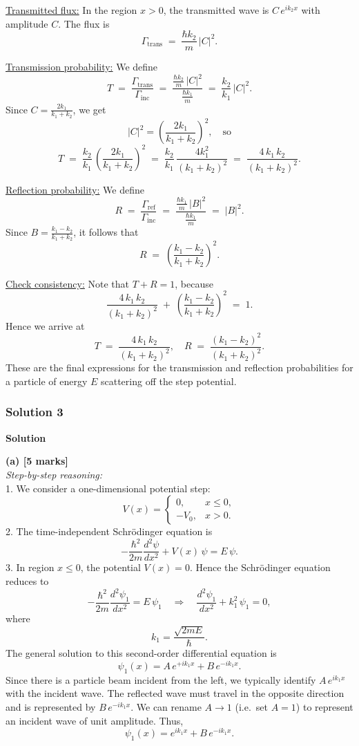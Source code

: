 \documentclass{article}
\begin{document}
\underline{Transmitted flux:} In the region \(x > 0\), the transmitted wave is \(C\, e^{i k_2 x}\) with amplitude \(C\). The flux is
\[
\Gamma_\mathrm{trans} \;=\;\frac{\hbar k_2}{m}\,\bigl|C\bigr|^2.
\]

\underline{Transmission probability:} We define
\[
T \;=\;\frac{\Gamma_\mathrm{trans}}{\Gamma_\mathrm{inc}}
\;=\;\frac{\tfrac{\hbar k_2}{m}\,|C|^2}{\tfrac{\hbar k_1}{m}}
\;=\;\frac{k_2}{k_1}\,\bigl|C\bigr|^2.
\]
Since \(C = \frac{2k_1}{k_1 + k_2}\), we get
\[
|C|^2 = \left(\frac{2k_1}{k_1 + k_2}\right)^2,
\quad
\text{so}
\]
\[
T \;=\;\frac{k_2}{k_1}\,\left(\frac{2 k_1}{k_1 + k_2}\right)^2 
\;=\;\frac{k_2}{k_1}\,\frac{4 k_1^2}{(k_1 + k_2)^2}
\;=\;\frac{4\,k_1\,k_2}{(k_1 + k_2)^2}.
\]

\underline{Reflection probability:} We define
\[
R \;=\;\frac{\Gamma_\mathrm{ref}}{\Gamma_\mathrm{inc}}
\;=\;\frac{\tfrac{\hbar k_1}{m}\,|B|^2}{\tfrac{\hbar k_1}{m}}
\;=\;|B|^2.
\]
Since \(B = \frac{k_1 - k_2}{k_1 + k_2}\), it follows that
\[
R \;=\;\left(\frac{k_1 - k_2}{k_1 + k_2}\right)^2.
\]

\underline{Check consistency:} Note that \(T + R = 1\), because
\[
\frac{4\,k_1\,k_2}{(k_1 + k_2)^2}
\;+\;
\left(\frac{k_1 - k_2}{k_1 + k_2}\right)^2
\;=\;1.
\]
Hence we arrive at
\[
T \;=\;\frac{4\,k_1\,k_2}{(k_1 + k_2)^2},
\quad
R \;=\;\frac{(k_1 - k_2)^2}{(k_1 + k_2)^2}.
\]
These are the final expressions for the transmission and reflection probabilities for a particle of energy \(E\) scattering off the step potential.

\subsubsection{Solution 3}
\textbf{Solution}

\textbf{(a) [5 marks]}\\
\textit{Step-by-step reasoning:}\\
1. We consider a one-dimensional potential step:
\[
V(x) = 
\begin{cases}
0, & x \leq 0,\\
-V_0, & x > 0.
\end{cases}
\]
2. The time-independent Schr\"odinger equation is
\[
-\frac{\hbar^2}{2m}\frac{d^2 \psi}{dx^2} + V(x)\,\psi = E\,\psi.
\]
3. In region \( x \leq 0 \), the potential \( V(x) = 0 \). Hence the Schr\"odinger equation reduces to
\[
-\frac{\hbar^2}{2m}\frac{d^2 \psi_1}{dx^2} = E \,\psi_1 \quad\Longrightarrow\quad \frac{d^2 \psi_1}{dx^2} + k_1^2\,\psi_1 = 0,
\]
where
\[
k_1 = \frac{\sqrt{2mE}}{\hbar}.
\]
The general solution to this second-order differential equation is
\[
\psi_1(x) = A\,e^{+i k_1 x} + B\,e^{-i k_1 x}.
\]
Since there is a particle beam incident from the left, we typically identify \( A\,e^{i k_1 x} \) with the incident wave. The reflected wave must travel in the opposite direction and is represented by \( B\,e^{-i k_1 x} \). We can rename \( A \to 1 \) (i.e.\ set \( A=1 \)) to represent an incident wave of unit amplitude. Thus,
\[
\psi_1(x) = e^{i k_1 x} + B\,e^{-i k_1 x}.
\]
\end{document}
